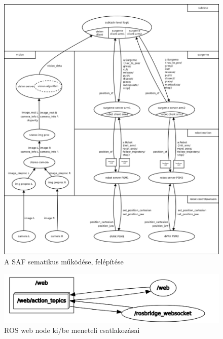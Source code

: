 \documentclass[12pt,a4paper,oneside]{report} %
\begin{document}
\begin{figure}[H]
	\label{fig:irob}
\begin{center}
	\includegraphics[width=14cm]{irobArch}
	\caption{A SAF sematikus működése, felépítése \cite{Abc-irobotics2020May} }
\end{center}
\end{figure}
\begin{figure}[H]
	\centering
	\label{fig:irob_web}
	\includegraphics[width=14cm]{irob_web}
	\caption{ROS web node ki/be meneteli csatlakozásai \cite{Abc-irobotics2020May} }
\end{figure}
\newpage
\end{document}
